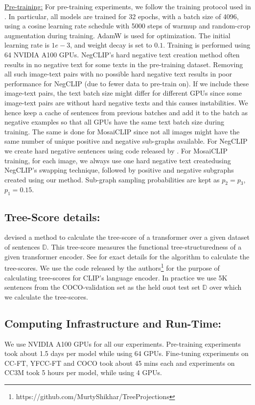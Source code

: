 \documentclass[11pt]{article}
\newcommand{\methodcomp}{MosaiCLIP}
\newcommand{\negclip}{NegCLIP}
\begin{document}
\noindent\underline{Pre-training:} For pre-training experiments, we follow the training protocol used in \citet{yang2022unified, radford2021learning}. In particular, all models are trained for 32 epochs, with a batch size of 4096, using a cosine learning rate schedule with 5000 steps of warmup and random-crop augmentation during training. AdamW is used for optimization. The initial learning rate is $1e-3$, and weight decay is set to $0.1$. Training is performed using 64 NVIDIA A100 GPUs.
\negclip{}'s hard negative text creation method often results in no negative text for some texts in the pre-training dataset. Removing all such image-text pairs with no possible hard negative text results in poor performance for \negclip{} (due to fewer data to pre-train on). If we include these image-text pairs, the text batch size might differ for different GPUs since some image-text pairs are without hard negative texts and this causes instabilities. We hence keep a cache of sentences from previous batches and add it to the batch as negative examples so that all GPUs have the same text batch size during training. The same is done for \methodcomp{} since not all images might have the same number of unique positive and negative sub-graphs available. For \negclip{} we create hard negative sentences using code released by \citep{yuksekgonul2022and}. For \methodcomp{} training, for each image, we always use one hard negative text createdusing \negclip{}'s swapping technique, followed by positive and negative subgraphs created using our method. Sub-graph sampling probabilities are kept as $p_2=p_3$, $p_1=0.15$.
\subsection{Tree-Score details:} \citet{murty2022characterizing} devised a method to calculate the tree-score of a transformer over a given dataset of sentences $\mathbb{D}$. This tree-score measures the functional tree-structuredness of a given transformer encoder. See \citet{murty2022characterizing} for exact details for the algorithm to calculate the tree-scores. We use the code released by the authors\footnote{https://github.com/MurtyShikhar/TreeProjections} for the purpose of calculating tree-scores for CLIP's language encoder. In practice we use 5K sentences from the COCO-validation set as the held ouot test set $\mathbb{D}$ over which we calculate the tree-scores.

\subsection{Computing Infrastructure and Run-Time:} We use NVIDIA A100 GPUs for all our experiments. Pre-training experiments took about 1.5 days per model while using 64 GPUs. Fine-tuning experiments on CC-FT, YFCC-FT and COCO took about 45 mins each and experiments on CC3M took 5 hours per model, while using 4 GPUs.
\end{document}
